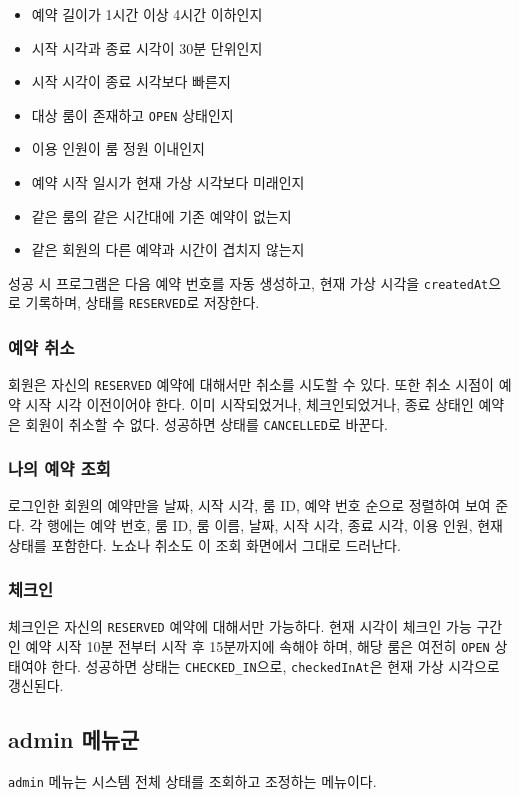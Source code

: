 \documentclass[a4paper,10pt]{article}
\begin{document}
\begin{itemize}[leftmargin=1.8em,itemsep=0.2em]
\item 예약 길이가 1시간 이상 4시간 이하인지
\item 시작 시각과 종료 시각이 30분 단위인지
\item 시작 시각이 종료 시각보다 빠른지
\item 대상 룸이 존재하고 \texttt{OPEN} 상태인지
\item 이용 인원이 룸 정원 이내인지
\item 예약 시작 일시가 현재 가상 시각보다 미래인지
\item 같은 룸의 같은 시간대에 기존 예약이 없는지
\item 같은 회원의 다른 예약과 시간이 겹치지 않는지
\end{itemize}

성공 시 프로그램은 다음 예약 번호를 자동 생성하고, 현재 가상 시각을 \texttt{createdAt}으로 기록하며, 상태를 \texttt{RESERVED}로 저장한다.

\subsubsection{예약 취소}
회원은 자신의 \texttt{RESERVED} 예약에 대해서만 취소를 시도할 수 있다. 또한 취소 시점이 예약 시작 시각 이전이어야 한다. 이미 시작되었거나, 체크인되었거나, 종료 상태인 예약은 회원이 취소할 수 없다. 성공하면 상태를 \texttt{CANCELLED}로 바꾼다.

\subsubsection{나의 예약 조회}
로그인한 회원의 예약만을 날짜, 시작 시각, 룸 ID, 예약 번호 순으로 정렬하여 보여 준다. 각 행에는 예약 번호, 룸 ID, 룸 이름, 날짜, 시작 시각, 종료 시각, 이용 인원, 현재 상태를 포함한다. 노쇼나 취소도 이 조회 화면에서 그대로 드러난다.

\subsubsection{체크인}
체크인은 자신의 \texttt{RESERVED} 예약에 대해서만 가능하다. 현재 시각이 체크인 가능 구간인 예약 시작 10분 전부터 시작 후 15분까지에 속해야 하며, 해당 룸은 여전히 \texttt{OPEN} 상태여야 한다. 성공하면 상태는 \texttt{CHECKED\_IN}으로, \texttt{checkedInAt}은 현재 가상 시각으로 갱신된다.

\subsection{admin 메뉴군}
\texttt{admin} 메뉴는 시스템 전체 상태를 조회하고 조정하는 메뉴이다.
\end{document}
